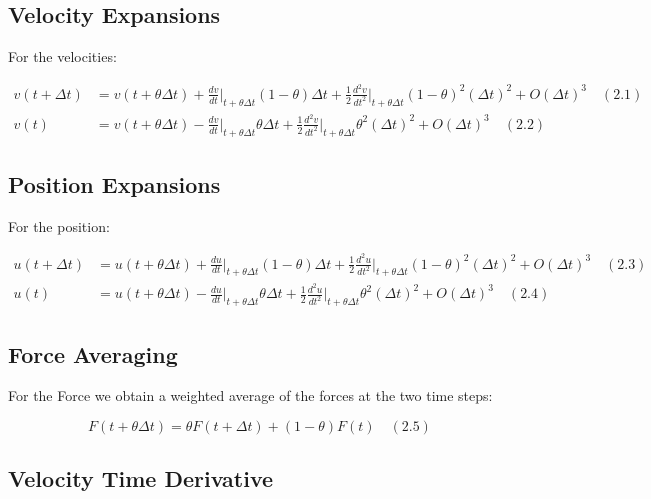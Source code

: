 \documentclass[
  11pt,
  a4paper,
]{scrbook}
\begin{document}
\subsection{Velocity Expansions}\label{velocity-expansions}

For the velocities:

\[
\begin{aligned}
v(t + \Delta t) &= v(t + \theta \Delta t) + \frac{dv}{dt}\bigg|_{t+\theta \Delta t} (1 - \theta) \Delta t + \frac{1}{2} \frac{d^2 v}{dt^2}\bigg|_{t+\theta \Delta t} (1 - \theta)^2 (\Delta t)^2 + O(\Delta t)^3 \quad (2.1)\\
v(t) &= v(t + \theta \Delta t) - \frac{dv}{dt}\bigg|_{t+\theta \Delta t} \theta \Delta t + \frac{1}{2} \frac{d^2 v}{dt^2}\bigg|_{t+\theta \Delta t} \theta^2 (\Delta t)^2 + O(\Delta t)^3 \quad (2.2)
\end{aligned}
\]

\subsection{Position Expansions}\label{position-expansions}

For the position:

\[
\begin{aligned}
u(t + \Delta t) &= u(t + \theta \Delta t) + \frac{du}{dt}\bigg|_{t+\theta \Delta t} (1 - \theta) \Delta t + \frac{1}{2} \frac{d^2 u}{dt^2}\bigg|_{t+\theta \Delta t} (1 - \theta)^2 (\Delta t)^2 + O(\Delta t)^3 \quad (2.3) \\
u(t) &= u(t + \theta \Delta t) - \frac{du}{dt}\bigg|_{t+\theta \Delta t} \theta \Delta t + \frac{1}{2} \frac{d^2 u}{dt^2}\bigg|_{t+\theta \Delta t} \theta^2 (\Delta t)^2 + O(\Delta t)^3 \quad (2.4)
\end{aligned}
\]

\subsection{Force Averaging}\label{force-averaging}

For the Force we obtain a weighted average of the forces at the two time
steps:

\[
F(t+\theta \Delta t) = \theta F(t+\Delta t) + (1-\theta) F(t) \quad (2.5)
\]

\subsection{Velocity Time Derivative}\label{velocity-time-derivative}
\end{document}

